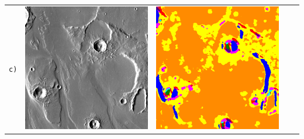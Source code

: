 \begin{table}[h!]
\begin{tabularx}{\textwidth}{>{\centering}m{}
			>{\centering}m{}
			>{\centering}m{}
			>{\centering}m{}
			>{\centering\arraybackslash}m{}}
		\texttt{c)} &
		\includegraphics[width=0.9\linewidth]{images/gen/results_robbins/input/thm_dir_N-30_210.png_sourcetile_160.png} &
		\includegraphics[width=0.9\linewidth]{images/gen/results_robbins/result/thm_dir_N-30_210.png_tile_160.png} &

\end{tabularx}
\end{table}

